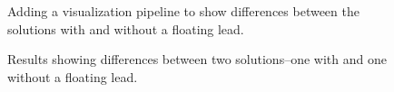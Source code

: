 \documentclass[fleqn,11pt,openany]{book}
\begin{document}
\begin{figure}
\caption{Adding a visualization pipeline to show differences between
the solutions with and without a floating
lead.}\label{fig:defib_fem_nw_12}
\end{figure}

\begin{figure}
\caption{Results showing differences between two solutions--one with
and one without a floating lead.}\label{fig:defib_fem_r_12}
\end{figure}
\end{document}
